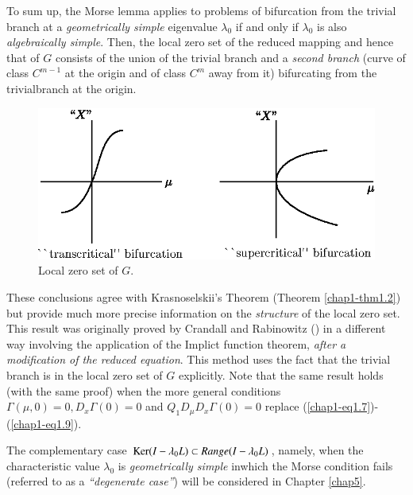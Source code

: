 To sum up, the Morse lemma applies to problems of bifurcation from the trivial branch at a {\em geometrically simple} eigenvalue $\lambda_{0}$ if and only if $\lambda_{0}$ is also {\em algebraically simple}. Then, the local zero set of the reduced mapping and hence that of $G$ consists of the union of the trivial branch and a {\em second branch} (curve of class $C^{m-1}$ at the origin and of class $C^{m}$ away from it) bifurcating from the trivial\pageoriginale branch at the origin.
\begin{figure}[H]
\centering
\includegraphics{figure/fig76-3.4.eps}
\caption{Local zero set of $G$.}
\end{figure}

\begin{remark}\label{chap1-rem3.6}
These conclusions agree with Krasnoselskii's Theorem (Theorem \ref{chap1-thm1.2}) but provide much more precise information on the {\em structure} of the local zero set. This result was originally proved by Crandall and Rabinowitz (\cite{7}) in a different way involving the application of the Implict function theorem, {\em after a modification of the reduced equation}. This method uses the fact that the trivial branch is in the local zero set of $G$ explicitly. Note that the same result holds (with the same proof) when the more general conditions $\Gamma(\mu, 0) = 0, D_{x} \Gamma(0) = 0$ and $Q_{1}D_{\mu}D_{x} \Gamma(0) = 0$ replace (\ref{chap1-eq1.7})-(\ref{chap1-eq1.9}).
\end{remark}

\begin{remark}\label{chap1-rem3.7}
The complementary case $\operatorname{Ker} (I - \lambda_{0}L) \subset Range(I - \lambda_{0}L)$, namely, when the characteristic value $\lambda_{0}$ is {\em geometrically simple} in\break which the Morse condition fails (referred to as a {\em ``degenerate case''}) will be considered in Chapter \ref{chap5}.
\end{remark}
